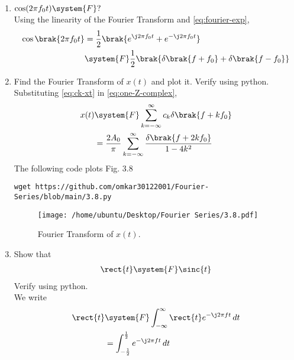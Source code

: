 \documentclass[journal,12pt,twocolumn]{IEEEtran}
\renewcommand\thesection{\arabic{section}}
\begin{document}
\begin{enumerate}[label=\thesection.\arabic*
,ref=\thesection.\theenumi]
\solution
Suppose $g(t)\system{F}G(f)$. Then,
\begin{align}
	g(t)e^{\j2\pi f_0t}&\system{F}\int_{-\infty}^{\infty}
	g(t)e^{-\j2\pi\brak{f-f_0}t}\, dt \\
	&=F(f-f_0)
	\label{eq:f-shift}
\end{align}
Using \eqref{eq:duality} in \eqref{eq:fourier-delta}, $1\system{F}\delta(-f)$.
Hence, applying \eqref{eq:f-shift},
\begin{align}
	e^{-\j2\pi f_0t}\system{F}\delta(-(f+f_0)) = \delta(f+f_0)
	\label{eq:fourier-exp}
\end{align}
\item $\cos(2\pi f_0t)\system{F}?$ \\
\solution
Using the linearity of the Fourier 
Transform and \eqref{eq:fourier-exp},
\begin{align}
	\cos\brak{2\pi f_0t} &= \frac{1}{2}
	\brak{e^{\j2\pi f_0t} + e^{-\j2\pi f_0t}} \\
	&\system{F}\frac{1}{2}\brak{\delta\brak{f+f_0} + \delta\brak{f-f_0}}
\end{align}
\item Find the Fourier Transform of $x(t)$ and plot it.  Verify using python. \\
\solution
Substituting \eqref{eq:ck-xt} in \eqref{eq:one-Z-complex},
\begin{align}
	x(t)&\system{F}\sum_{k=-\infty}^{\infty}c_k\delta\brak{f+kf_0} \\
	&=\frac{2A_0}{\pi}\sum_{k=-\infty}^{\infty}\frac{\delta\brak{f+2kf_0}}{1-4k^2}
	\label{eq:fourier-xt}
\end{align}
The following code plots Fig. 3.8
\begin{lstlisting}
wget https://github.com/omkar30122001/Fourier-Series/blob/main/3.8.py
\end{lstlisting}
\begin{figure}[!ht]
	\texttt{[image: /home/ubuntu/Desktop/Fourier Series/3.8.pdf]}
	\caption{Fourier Transform of $x(t)$.}
	\label{fig:fourier-xt}
\end{figure}
\item Show that 
\begin{align}
	\rect{t} \system{F} \sinc{t}
\end{align}
Verify using python. \\
\solution
We write
\begin{align}
	\rect{t}&\system{F}\int_{-\infty}^{\infty}\rect{t}e^{-\j2\pi ft}\, dt \\
	&=\int_{-\frac{1}{2}}^{\frac{1}{2}}e^{-\j2\pi ft}\, dt \\

\end{align}
\end{enumerate}
\end{document}
